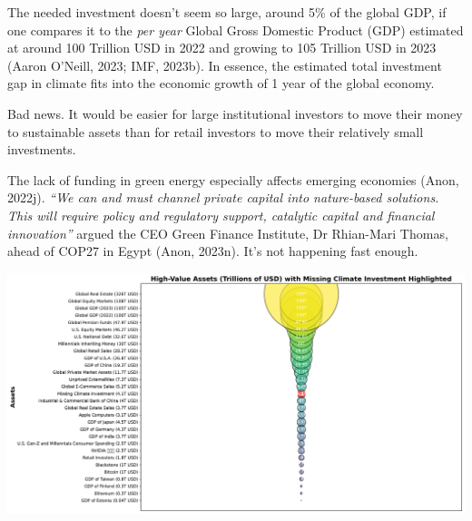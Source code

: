 \documentclass[
  letterpaper,
  DIV=11,
  numbers=noendperiod]{scrartcl}
\begin{document}
The needed investment doesn't seem so large, around 5\% of the global
GDP, if one compares it to the \emph{per year} Global Gross Domestic
Product (GDP) estimated at around 100 Trillion USD in 2022 and growing
to 105 Trillion USD in 2023 (Aaron O'Neill, 2023; IMF, 2023b). In
essence, the estimated total investment gap in climate fits into the
economic growth of 1 year of the global economy.

Bad news. It would be easier for large institutional investors to move
their money to sustainable assets than for retail investors to move
their relatively small investments.

The lack of funding in green energy especially affects emerging
economies (Anon, 2022j). \emph{``We can and must channel private capital
into nature-based solutions. This will require policy and regulatory
support, catalytic capital and financial innovation''} argued the CEO
Green Finance Institute, Dr Rhian-Mari Thomas, ahead of COP27 in Egypt
(Anon, 2023n). It's not happening fast enough.

\includegraphics{_thesis_files/figure-pdf/cell-40-output-1.pdf}
\end{document}
